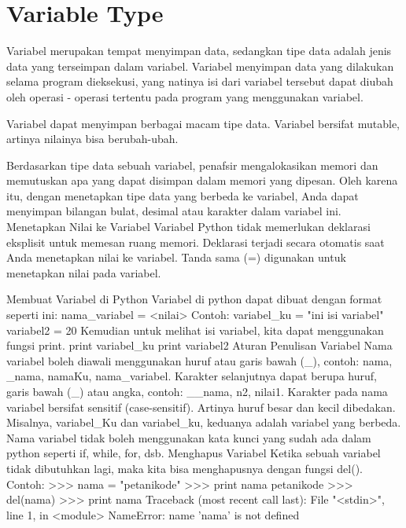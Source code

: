 \section{Variable Type}
Variabel merupakan tempat menyimpan data, sedangkan tipe data adalah jenis data yang terseimpan dalam variabel. Variabel menyimpan data yang dilakukan selama program dieksekusi, yang natinya isi dari variabel tersebut dapat diubah oleh operasi - operasi tertentu pada program yang menggunakan variabel.

Variabel dapat menyimpan berbagai macam tipe data. Variabel bersifat mutable, artinya nilainya bisa berubah-ubah.

Berdasarkan tipe data sebuah variabel, penafsir mengalokasikan memori dan memutuskan apa yang dapat disimpan dalam memori yang dipesan. Oleh karena itu, dengan menetapkan tipe data yang berbeda ke variabel, Anda dapat menyimpan bilangan bulat, desimal atau karakter dalam variabel ini.
Menetapkan Nilai ke Variabel
Variabel Python tidak memerlukan deklarasi eksplisit untuk memesan ruang memori. Deklarasi terjadi secara otomatis saat Anda menetapkan nilai ke variabel. Tanda sama (=) digunakan untuk menetapkan nilai pada variabel.

Membuat Variabel di Python
Variabel di python dapat dibuat dengan format seperti ini:
nama_variabel = <nilai>
Contoh:
variabel_ku = "ini isi variabel"
variabel2 = 20
Kemudian untuk melihat isi variabel, kita dapat menggunakan fungsi print.
print variabel_ku
print variabel2
Aturan Penulisan Variabel
Nama variabel boleh diawali menggunakan huruf atau garis bawah (_), contoh: nama, _nama, namaKu, nama_variabel.
Karakter selanjutnya dapat berupa huruf, garis bawah (_) atau angka, contoh: __nama, n2, nilai1.
Karakter pada nama variabel bersifat sensitif (case-sensitif). Artinya huruf besar dan kecil dibedakan. Misalnya, variabel_Ku dan variabel_ku, keduanya adalah variabel yang berbeda.
Nama variabel tidak boleh menggunakan kata kunci yang sudah ada dalam python seperti if, while, for, dsb.
Menghapus Variabel
Ketika sebuah variabel tidak dibutuhkan lagi, maka kita bisa menghapusnya dengan fungsi del().
Contoh:
>>> nama = "petanikode"
>>> print nama
petanikode
>>> del(nama)
>>> print nama
Traceback (most recent call last):
  File "<stdin>", line 1, in <module>
NameError: name 'nama' is not defined
